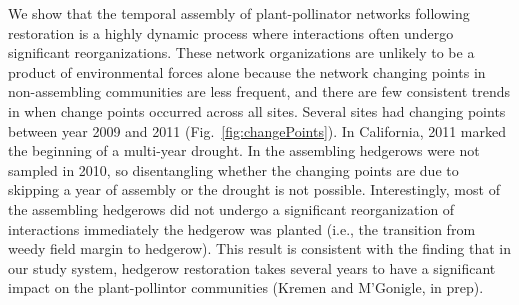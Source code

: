 \documentclass[12pt]{article}
\begin{document}
We show that the temporal assembly of plant-pollinator networks
following restoration is a highly dynamic process where interactions
often undergo significant reorganizations. These network organizations
are unlikely to be a product of environmental forces alone because the
network changing points in non-assembling communities are less
frequent, and there are few consistent trends in when change points
occurred across all sites. Several sites had changing points between
year 2009 and 2011 (Fig.~\ref{fig:changePoints}). In California, 2011
marked the beginning of a multi-year drought. In the assembling
hedgerows were not sampled in 2010, so disentangling whether the
changing points are due to skipping a year of assembly or the drought
is not possible. Interestingly, most of the assembling hedgerows did
not undergo a significant reorganization of interactions immediately
the hedgerow was planted (i.e., the transition from weedy field margin
to hedgerow). This result is consistent with the finding that in our
study system, hedgerow restoration takes several years to have a
significant impact on the plant-pollintor communities (Kremen and
M'Gonigle, in prep).

\end{document}
